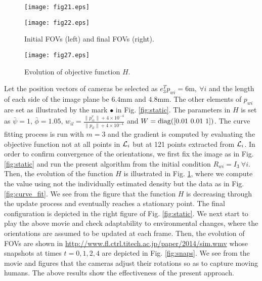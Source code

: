 \documentclass[conference,letterpaper]{ieeeconf}
\newcommand{\ewi}{R_{wi}}
\renewcommand{\L}{{\cal L}}
\begin{document}
\begin{figure}[t]
\begin{center}
\begin{minipage}{4cm}
\begin{center}
\texttt{[image: fig21.eps]}
\end{center}
\end{minipage}
\hspace{.2cm}
\begin{minipage}{4cm}
\begin{center}
\texttt{[image: fig22.eps]}
\end{center}
\end{minipage}
\caption{Initial FOVs (left) and final FOVs (right).}
\label{fig:static}
\medskip


\texttt{[image: fig27.eps]}
\caption{Evolution of objective function $H$.}
\label{fig:obj}
\end{center}
\end{figure}












Let the position vectors of cameras be selected as $e_3^T p_{wi} = 6\mbox{m},\ {\forall i}$
and the length of each side of the image plane be $6.4$mm and $4.8$mm.
The other elements of $p_{wi}$ are set as illustrated by the mark $\bullet$ in Fig. \ref{fig:static}.
The parameters in $H$ is set as 
$\bar \psi = 1$, $\bar \phi = 1.05$, 
$w_{il} = \frac{\|p^v_{i1}\|+4\times 10^{-4}}{\|p_{il}\|+4\times 10^{-4}}$ 
and $W = {\rm diag}([0.01\ 0.01\ 1])$.
The curve fitting process
is run with $m = 3$ and the gradient is computed
by evaluating the objective function not at all points in $\L_i$
but at 121 points extracted from $\L_i$.
In order to confirm convergence of the orientations,
we first fix the image as in Fig. \ref{fig:static}
and run the present algorithm from the initial condition $\ewi = I_3\ {\forall i}$.
Then, the evolution of the function $H$ is illustrated in Fig. \ref{fig:obj},
where we compute the value using not the individually estimated density but
the data as in Fig. \ref{fig:curve_fit}.
We see from the figure that the function $H$ is decreasing
through the update process and eventually reaches a stationary point.
The final configuration is depicted in the right figure of Fig. \ref{fig:static}.
We next start to play the above movie and 
check adaptability to environmental changes,
where the orientations are assumed to be updated 
at each frame.
Then, the evolution of FOVs are shown in
\url{http://www.fl.ctrl.titech.ac.jp/paper/2014/sim.wmv}
whose snapshots at times $t = 0,1,2,4$ are depicted in Fig. \ref{fig:snaps}.
We see from the movie and figures that the cameras adjust their rotations
so as to capture moving humans.
The above results show the effectiveness of the present approach.
\end{document}
